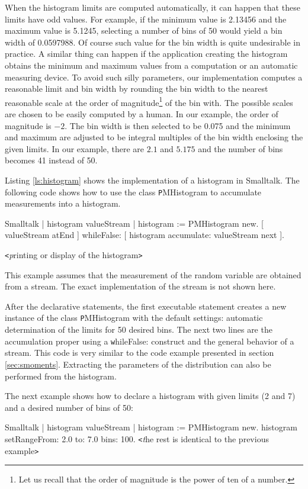 When the histogram limits are computed automatically, it can
happen that these limits have odd values. For example, if the
minimum value is 2.13456 and the maximum value is 5.1245,
selecting a number of bins of 50 would yield a bin width of
0.0597988. Of course such value for the bin width is quite
undesirable in practice. A similar thing can happen if the
application creating the histogram obtains the minimum and maximum
values from a computation or an automatic measuring device. To
avoid such silly parameters, our implementation computes a
reasonable limit and bin width by rounding the bin width to the
nearest reasonable scale at the order of magnitude\footnote{Let us
recall that the order of magnitude is the power of ten of a
number.} of the bin with. The possible scales are chosen to be
easily computed by a human. In our example, the order of magnitude
is $-2$. The bin width is then selected to be 0.075 and the
minimum and maximum are adjusted to be integral multiples of the
bin width enclosing the given limits. In our example, there are
$2.1$ and $5.175$ and the number of bins becomes 41 instead of 50.

\label{sec:shistogram} Listing \ref{ls:histogram} shows the
implementation of a histogram in Smalltalk. The following code
shows how to use the class {\texttt PMHistogram} to accumulate
measurements into a histogram.
\begin{displaycode}{Smalltalk}
 | histogram valueStream |
 histogram := PMHistogram new.
 [ valueStream atEnd ]
 whileFalse: [ histogram accumulate: valueStream next ].
\end{displaycode} 
\hfil {\texttt<\textsl printing or display of the histogram\texttt >}\hfil

This example assumes that the measurement of the random variable
are obtained from a stream.
The exact implementation of the stream is not shown here.

After the declarative statements, the first executable statement
creates a new instance of the class {\texttt PMHistogram} with the
default settings: automatic determination of the limits for 50
desired bins. The next two lines are the accumulation proper using
a {\texttt whileFalse:} construct and the general behavior of a
stream. This code is very similar to the code example presented in
section \ref{sec:smoments}.
Extracting the parameters of the distribution can also be performed from the histogram.

\noindent The next example shows how to declare a histogram with
given limits (2 and 7) and a desired number of bins of 50:
\begin{displaycode}{Smalltalk}
 | histogram valueStream |
 histogram := PMHistogram new.
 histogram setRangeFrom: 2.0 to: 7.0 bins: 100.
\hfil {\texttt<\textsl the rest is identical to the previous example\texttt
>}\hfil
\end{displaycode}

